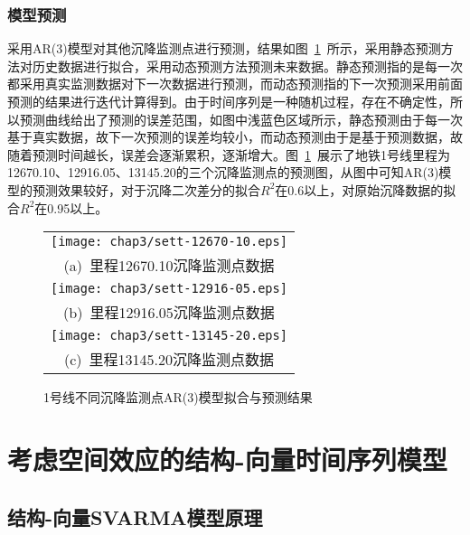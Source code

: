 \subsubsection{模型预测}

采用AR(3)模型对其他沉降监测点进行预测，结果如图~\ref{fig:不同沉降监测点AR3模型拟合与预测结果}~所示，采用静态预测方法对历史数据进行拟合，采用动态预测方法预测未来数据。静态预测指的是每一次都采用真实监测数据对下一次数据进行预测，而动态预测指的下一次预测采用前面预测的结果进行迭代计算得到。由于时间序列是一种随机过程，存在不确定性，所以预测曲线给出了预测的误差范围，如图中浅蓝色区域所示，静态预测由于每一次基于真实数据，故下一次预测的误差均较小，而动态预测由于是基于预测数据，故随着预测时间越长，误差会逐渐累积，逐渐增大。图~\ref{fig:不同沉降监测点AR3模型拟合与预测结果}~展示了地铁1号线里程为 12670.10、12916.05、13145.20的三个沉降监测点的预测图，从图中可知AR(3)模型的预测效果较好，对于沉降二次差分的拟合$R^2$在0.6以上，对原始沉降数据的拟合$R^2$在0.95以上。

\begin{figure}[htbp] 
    \centering 
    \begin{tabular}{c} 
        \texttt{[image: chap3/sett-12670-10.eps]} \\ 
        (a)~里程12670.10沉降监测点数据 \\
        \texttt{[image: chap3/sett-12916-05.eps]} \\ 
        (b)~里程12916.05沉降监测点数据 \\
        \texttt{[image: chap3/sett-13145-20.eps]} \\ 
        (c)~里程13145.20沉降监测点数据 \\
    \end{tabular}
    \caption{1号线不同沉降监测点AR(3)模型拟合与预测结果} 
    \label{fig:不同沉降监测点AR3模型拟合与预测结果} 
\end{figure}

\section{考虑空间效应的结构-向量时间序列模型}

\subsection{结构-向量SVARMA模型原理}

